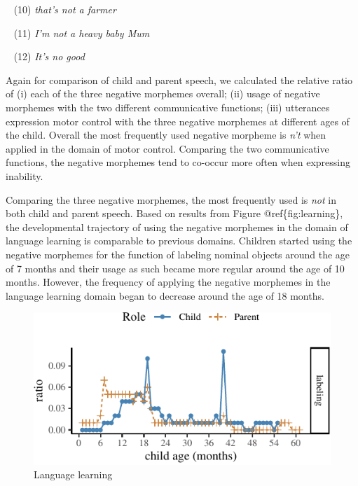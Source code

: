 \documentclass[10pt, letterpaper]{article}
\newenvironment{CodeChunk}{}{}
\begin{document}
~ (10) \emph{that's not a farmer}

~ (11) \emph{I'm not a heavy baby Mum}

~ (12) \emph{It's no good}

Again for comparison of child and parent speech, we calculated the
relative ratio of (i) each of the three negative morphemes overall; (ii)
usage of negative morphemes with the two different communicative
functions; (iii) utterances expression motor control with the three
negative morphemes at different ages of the child. Overall the most
frequently used negative morpheme is \emph{n't} when applied in the
domain of motor control. Comparing the two communicative functions, the
negative morphemes tend to co-occur more often when expressing
inability.

Comparing the three negative morphemes, the most frequently used is
\emph{not} in both child and parent speech. Based on results from Figure
@ref\{fig:learning\}, the developmental trajectory of using the negative
morphemes in the domain of language learning is comparable to previous
domains. Children started using the negative morphemes for the function
of labeling nominal objects around the age of 7 months and their usage
as such became more regular around the age of 10 months. However, the
frequency of applying the negative morphemes in the language learning
domain began to decrease around the age of 18 months.

\begin{CodeChunk}
\begin{figure}[H]

{\centering \includegraphics{figs/learning-1} 

}

\caption[Language learning]{Language learning}\label{fig:learning}
\end{figure}
\end{CodeChunk}
\end{document}
